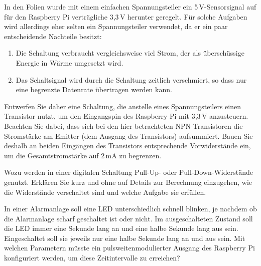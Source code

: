 
\bigskip
\teilaufgabe
In den Folien wurde mit einem einfachen Spannungsteiler ein 5\,V-Sensorsignal
auf für den Raspberry Pi verträgliche 3,3\,V herunter geregelt. Für solche
Aufgaben wird allerdings eher selten ein Spannungsteiler verwendet, da er ein
paar entscheidende Nachteile besitzt:

\begin{enumerate}
    \item Die Schaltung verbraucht vergleichsweise viel Strom, der als überschüssige
    Energie in Wärme umgesetzt wird.

    \item Das Schaltsignal wird durch die Schaltung zeitlich verschmiert, so dass
    nur eine begrenzte Datenrate übertragen werden kann.
\end{enumerate}

Entwerfen Sie daher eine Schaltung, die anstelle eines Spannungsteilers einen
Transistor nutzt, um den Eingangspin des Raspberry Pi mit 3,3\,V anzusteuern.
Beachten Sie dabei, dass sich bei den hier betrachteten NPN-Transistoren die
Stromstärke am Emitter (dem Ausgang des Transistors) aufsummiert. Bauen Sie
deshalb an beiden Eingängen des Transistors entsprechende Vorwiderstände ein,
um die Gesamtstromstärke auf 2\,mA zu begrenzen.

\bigskip
\teilaufgabe
Wozu werden in einer digitalen Schaltung Pull-Up- oder Pull-Down-Widerstände
genutzt. Erklären Sie kurz und ohne auf Details zur Berechnung einzugehen, wie
die Widerstände verschaltet sind und welche Aufgabe sie erfüllen.

\bigskip
\teilaufgabe
In einer Alarmanlage soll eine LED unterschiedlich schnell blinken, je nachdem
ob die Alarmanlage scharf geschaltet ist oder nicht. Im ausgeschalteten Zustand
soll die LED immer eine Sekunde lang an und eine halbe Sekunde lang aus sein.
Eingeschaltet soll sie jeweils nur eine halbe Sekunde lang an und aus sein.
Mit welchen Parametern müsste ein pulsweitenmodulierter Ausgang des Raspberry
Pi konfiguriert werden, um diese Zeitintervalle zu erreichen?

